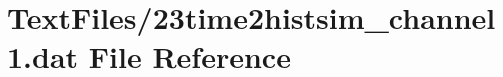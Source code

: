 \hypertarget{23time2histsim__channel1_8dat}{}\section{Text\+Files/23time2histsim\+\_\+channel1.dat File Reference}
\label{23time2histsim__channel1_8dat}
